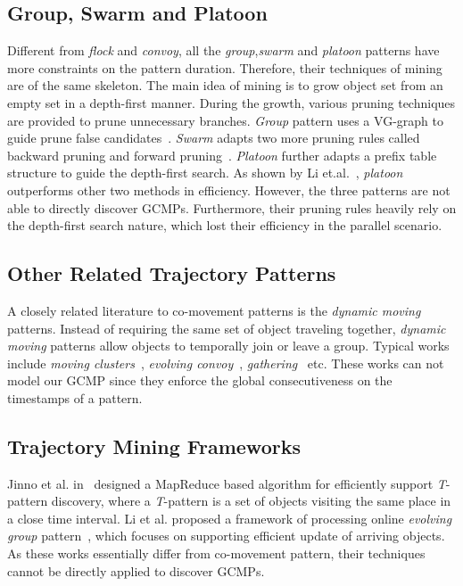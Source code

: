 \subsection{Group, Swarm and Platoon}
Different from \emph{flock} and \emph{convoy}, all the \emph{group},\emph{swarm} and \emph{platoon}
patterns have more constraints on the pattern duration. Therefore, their techniques of mining are of
the same skeleton. The main idea of mining is to grow object set from an empty set
in a depth-first manner. During the growth, various pruning techniques are provided to prune 
unnecessary branches. \emph{Group} pattern uses a VG-graph to guide prune false candidates~\cite{wang2006grouppattern}.
\emph{Swarm} adapts two more pruning rules called backward pruning and forward pruning~\cite{li2010swarm}. \emph{Platoon}
further adapts a prefix table structure to guide the depth-first search. As shown by Li et.al.~\cite{li2015platoon},
\emph{platoon} outperforms other two methods in efficiency. 
However, the three patterns are not able to directly discover GCMPs.
Furthermore, their pruning rules heavily rely on the depth-first search nature, which lost their efficiency
in the parallel scenario.

\subsection{Other Related Trajectory Patterns}
A closely related literature to co-movement patterns is the \emph{dynamic moving} patterns. Instead of requiring the same set of object traveling together, \emph{dynamic moving} patterns allow objects to temporally join or leave a group. Typical works include \emph{moving clusters}~\cite{kalnis2005movingclusters}, \emph{evolving convoy}~\cite{aung2010discovery}, \emph{gathering}~\cite{zheng2013gathering} etc. These works can not model our GCMP since they enforce the global consecutiveness on the timestamps of a pattern. 

\subsection{Trajectory Mining Frameworks}
Jinno et al. in~\cite{jinno2012paralleltpattern} designed a MapReduce based algorithm for efficiently support \emph{T}-pattern discovery, where a \emph{T}-pattern is a set of objects visiting the same place in a close time interval. Li et al. proposed a framework of processing online \emph{evolving group} pattern~\cite{li2013onlinegroup}, which focuses on supporting efficient update of arriving objects. 
As these works essentially differ from co-movement pattern, their techniques cannot be directly applied to discover GCMPs.

